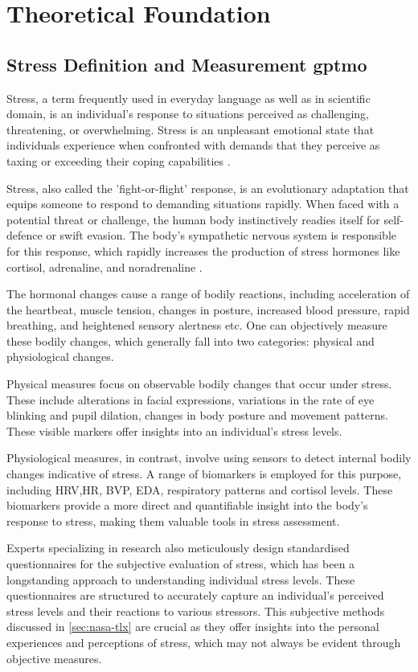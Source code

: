 \chapter{Theoretical Foundation}

\section{Stress Definition and Measurement \gls{gptmo}}
Stress, a term frequently used in everyday language as well as in scientific domain, is an individual's response to situations perceived as challenging, threatening, or overwhelming. Stress is an unpleasant emotional state that individuals experience when confronted with demands that they perceive as taxing or exceeding their coping capabilities \parencite{stress2}.

Stress, also called the 'fight-or-flight' response, is an evolutionary adaptation that equips someone to respond to demanding situations rapidly. When faced with a potential threat or challenge, the human body instinctively readies itself for self-defence or swift evasion. The body's sympathetic nervous system is responsible for this response, which rapidly increases the production of stress hormones like cortisol, adrenaline, and noradrenaline \parencite{1}.

The hormonal changes cause a range of bodily reactions, including acceleration of the heartbeat, muscle tension, changes in posture, increased blood pressure, rapid breathing, and heightened sensory alertness etc. One can objectively measure these bodily changes, which generally fall into two categories: physical and physiological changes.

Physical measures focus on observable bodily changes that occur under stress. These include alterations in facial expressions, variations in the rate of eye blinking and pupil dilation, changes in body posture and movement patterns. These visible markers offer insights into an individual's stress levels.

Physiological measures, in contrast, involve using sensors to detect internal bodily changes indicative of stress. A range of biomarkers is employed for this purpose, including \gls{HRV},\gls{HR}, \gls{BVP}, \gls{EDA}, respiratory patterns and cortisol levels. These biomarkers provide a more direct and quantifiable insight into the body's response to stress, making them valuable tools in stress assessment.

Experts specializing in research also meticulously design standardised questionnaires for the subjective evaluation of stress, which has been a longstanding approach to understanding individual stress levels. These questionnaires are structured to accurately capture an individual's perceived stress levels and their reactions to various stressors. This subjective methods discussed in \autoref{sec:nasa-tlx} are crucial as they offer insights into the personal experiences and perceptions of stress, which may not always be evident through objective measures.

